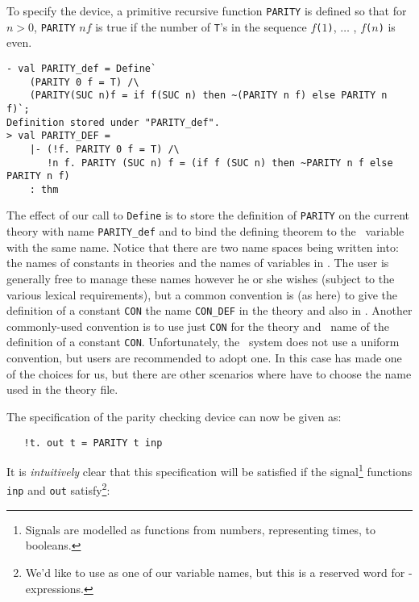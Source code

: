 \noindent To specify the device, a primitive recursive
function {\small\verb|PARITY|} is defined so that for $n>0$,
{\small\tt PARITY} $n f$ is true if the number of {\small\verb|T|}'s
in the sequence $f${\small\tt (}$1${\small\tt)}, $\ldots$ ,
$f${\small\tt (}$n${\small\tt)} is even.

\begin{session}
\begin{verbatim}
- val PARITY_def = Define`
    (PARITY 0 f = T) /\
    (PARITY(SUC n)f = if f(SUC n) then ~(PARITY n f) else PARITY n f)`;
Definition stored under "PARITY_def".
> val PARITY_DEF =
    |- (!f. PARITY 0 f = T) /\
       !n f. PARITY (SUC n) f = (if f (SUC n) then ~PARITY n f else PARITY n f)
    : thm
\end{verbatim}
\end{session}

\noindent
The effect of our call to {\small\verb|Define|} is to store the
definition of {\small\verb|PARITY|} on the current theory with name
{\small\verb|PARITY_def|} and to bind the defining theorem to the \ML\
variable with the same name.  Notice that there are two name spaces
being written into: the names of constants in theories and the names
of variables in \ML.  The user is generally free to manage these names
however he or she wishes (subject to the various lexical
requirements), but a common convention is (as here) to give the
definition of a constant {\small\tt CON} the name
{\small\verb|CON_DEF|} in the theory and also in \ML.  Another
commonly-used convention is to use just {\small\verb|CON|} for the
theory and \ML\ name of the definition of a constant
{\small\verb|CON|}.  Unfortunately, the \HOL\ system does not use a
uniform convention, but users are recommended to adopt one.  In this
case \ml{Define} has made one of the choices for us, but there are
other scenarios where have to choose the name used in the theory file.

The specification of the parity checking device can now be given as:

{\small\baselineskip\HOLSpacing\begin{verbatim}
   !t. out t = PARITY t inp
\end{verbatim}}

\noindent
It is {\it intuitively\/} clear that this specification will be
satisfied if the signal\footnote{Signals are modelled as functions
  from numbers, representing times, to booleans.}  functions
{\small\verb|inp|} and {\small\verb|out|} satisfy\footnote{We'd like
  to use \ml{in} as one of our variable names, but this is a reserved
  word for \ml{let}-expressions.}:

